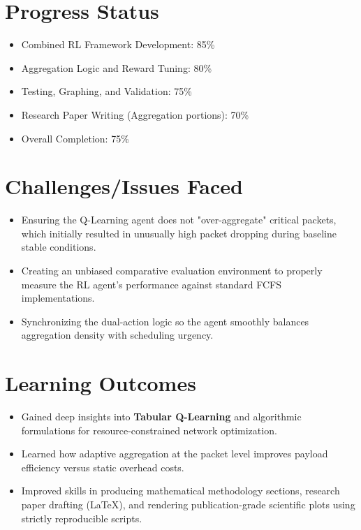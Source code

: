 \documentclass[12pt,a4paper]{article}
\begin{document}
\section{Progress Status}
\begin{itemize}[leftmargin=*]
    \item Combined RL Framework Development: 85\%
    \item Aggregation Logic and Reward Tuning: 80\%
    \item Testing, Graphing, and Validation: 75\%
    \item Research Paper Writing (Aggregation portions): 70\%
    \item Overall Completion: 75\%
\end{itemize}

\section{Challenges/Issues Faced}
\begin{itemize}[leftmargin=*]
    \item Ensuring the Q-Learning agent does not "over-aggregate" critical packets, which initially resulted in unusually high packet dropping during baseline stable conditions.
    \item Creating an unbiased comparative evaluation environment to properly measure the RL agent's performance against standard FCFS implementations.
    \item Synchronizing the dual-action logic so the agent smoothly balances aggregation density with scheduling urgency.
\end{itemize}

\section{Learning Outcomes}
\begin{itemize}[leftmargin=*]
    \item Gained deep insights into \textbf{Tabular Q-Learning} and algorithmic formulations for resource-constrained network optimization.
    \item Learned how adaptive aggregation at the packet level improves payload efficiency versus static overhead costs.
    \item Improved skills in producing mathematical methodology sections, research paper drafting (LaTeX), and rendering publication-grade scientific plots using strictly reproducible scripts.
\end{itemize}
\end{document}
